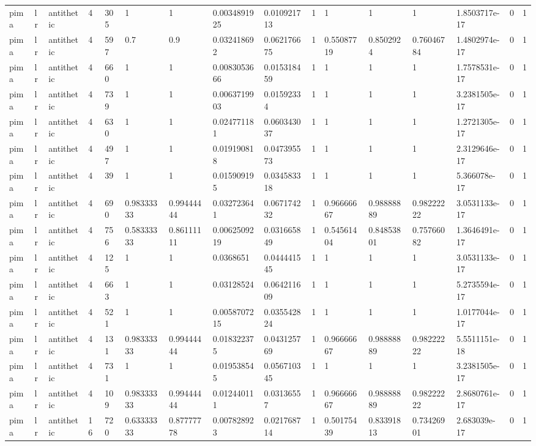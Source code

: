 \begin{tabular}{llllllllllllllll}
pima & lr & antithetic & 4 & 305 & 1 & 1 & 0.0034891925 & 0.010921713 & 1 & 1 & 1 & 1 & 1.8503717e-17 & 0 & 1 \\
pima & lr & antithetic & 4 & 597 & 0.7 & 0.9 & 0.032418692 & 0.062176675 & 1 & 0.55087719 & 0.8502924 & 0.76046784 & 1.4802974e-17 & 0 & 1 \\
pima & lr & antithetic & 4 & 660 & 1 & 1 & 0.0083053666 & 0.015318459 & 1 & 1 & 1 & 1 & 1.7578531e-17 & 0 & 1 \\
pima & lr & antithetic & 4 & 739 & 1 & 1 & 0.0063719903 & 0.01592334 & 1 & 1 & 1 & 1 & 3.2381505e-17 & 0 & 1 \\
pima & lr & antithetic & 4 & 630 & 1 & 1 & 0.024771181 & 0.060343037 & 1 & 1 & 1 & 1 & 1.2721305e-17 & 0 & 1 \\
pima & lr & antithetic & 4 & 497 & 1 & 1 & 0.019190818 & 0.047395573 & 1 & 1 & 1 & 1 & 2.3129646e-17 & 0 & 1 \\
pima & lr & antithetic & 4 & 39 & 1 & 1 & 0.015909195 & 0.034583318 & 1 & 1 & 1 & 1 & 5.366078e-17 & 0 & 1 \\
pima & lr & antithetic & 4 & 690 & 0.98333333 & 0.99444444 & 0.032723641 & 0.067174232 & 1 & 0.96666667 & 0.98888889 & 0.98222222 & 3.0531133e-17 & 0 & 1 \\
pima & lr & antithetic & 4 & 756 & 0.58333333 & 0.86111111 & 0.0062509219 & 0.031665849 & 1 & 0.54561404 & 0.84853801 & 0.75766082 & 1.3646491e-17 & 0 & 1 \\
pima & lr & antithetic & 4 & 125 & 1 & 1 & 0.0368651 & 0.044441545 & 1 & 1 & 1 & 1 & 3.0531133e-17 & 0 & 1 \\
pima & lr & antithetic & 4 & 663 & 1 & 1 & 0.03128524 & 0.064211609 & 1 & 1 & 1 & 1 & 5.2735594e-17 & 0 & 1 \\
pima & lr & antithetic & 4 & 521 & 1 & 1 & 0.0058707215 & 0.035542824 & 1 & 1 & 1 & 1 & 1.0177044e-17 & 0 & 1 \\
pima & lr & antithetic & 4 & 131 & 0.98333333 & 0.99444444 & 0.018322375 & 0.043125769 & 1 & 0.96666667 & 0.98888889 & 0.98222222 & 5.5511151e-18 & 0 & 1 \\
pima & lr & antithetic & 4 & 731 & 1 & 1 & 0.019538545 & 0.056710345 & 1 & 1 & 1 & 1 & 3.2381505e-17 & 0 & 1 \\
pima & lr & antithetic & 4 & 109 & 0.98333333 & 0.99444444 & 0.012440111 & 0.03136557 & 1 & 0.96666667 & 0.98888889 & 0.98222222 & 2.8680761e-17 & 0 & 1 \\
pima & lr & antithetic & 16 & 720 & 0.63333333 & 0.87777778 & 0.007828923 & 0.021768714 & 1 & 0.50175439 & 0.83391813 & 0.73426901 & 2.683039e-17 & 0 & 1 \\

\end{tabular}
